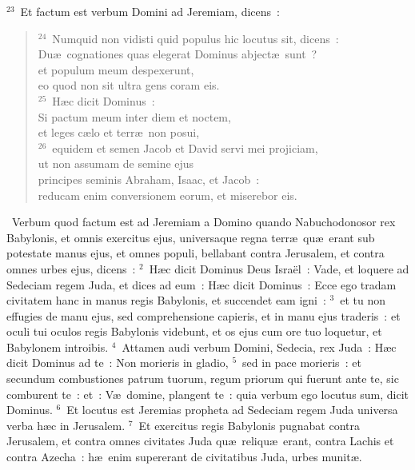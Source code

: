 ${}^{23}$~Et factum est verbum Domini ad Jeremiam, dicens~:
\begin{flushleft}\begin{verse}${}^{24}$~Numquid non vidisti quid populus hic locutus sit, dicens~:\\ Du\ae\ cognationes quas elegerat Dominus abject\ae\ sunt~?\\ et populum meum despexerunt,\\ eo quod non sit ultra gens coram eis.\\
${}^{25}$~H\ae c dicit Dominus~:\\ Si pactum meum inter diem et noctem,\\ et leges c\ae lo et terr\ae\ non posui,\\
${}^{26}$~equidem et semen Jacob et David servi mei projiciam,\\ ut non assumam de semine ejus\\ principes seminis Abraham, Isaac, et Jacob~:\\ reducam enim conversionem eorum, et miserebor eis.\end{verse}\end{flushleft}


~\lettrine[lines=10,image=true,loversize=0.05,lraise=-0.03]{V}{}erbum quod factum est ad Jeremiam a Domino quando Nabuchodonosor rex Babylonis, et omnis exercitus ejus, universaque regna terr\ae\ qu\ae\ erant sub potestate manus ejus, et omnes populi, bellabant contra Jerusalem, et contra omnes urbes ejus, dicens~:
${}^{2}$~H\ae c dicit Dominus Deus Isra\"el~: Vade, et loquere ad Sedeciam regem Juda, et dices ad eum~: H\ae c dicit Dominus~: Ecce ego tradam civitatem hanc in manus regis Babylonis, et succendet eam igni~:
${}^{3}$~et tu non effugies de manu ejus, sed comprehensione capieris, et in manu ejus traderis~: et oculi tui oculos regis Babylonis videbunt, et os ejus cum ore tuo loquetur, et Babylonem introibis.
${}^{4}$~Attamen audi verbum Domini, Sedecia, rex Juda~: H\ae c dicit Dominus ad te~: Non morieris in gladio,
${}^{5}$~sed in pace morieris~: et secundum combustiones patrum tuorum, regum priorum qui fuerunt ante te, sic comburent te~: et~: V\ae\ domine, plangent te~: quia verbum ego locutus sum, dicit Dominus.
${}^{6}$~Et locutus est Jeremias propheta ad Sedeciam regem Juda universa verba h\ae c in Jerusalem.
${}^{7}$~Et exercitus regis Babylonis pugnabat contra Jerusalem, et contra omnes civitates Juda qu\ae\ reliqu\ae\ erant, contra Lachis et contra Azecha~: h\ae\ enim supererant de civitatibus Juda, urbes munit\ae .


